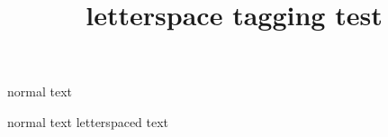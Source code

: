 \documentclass{article}
\title{letterspace tagging test}
\begin{document}
normal text


normal text {\lsstyle letterspaced text}

\end{document}
